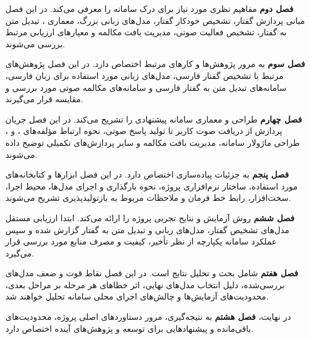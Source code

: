\textbf{فصل دوم} مفاهیم نظری مورد نیاز برای درک سامانه
را معرفی می‌کند.
در این فصل مبانی پردازش گفتار، تشخیص خودکار گفتار،
مدل‌های زبانی بزرگ، معماری ،
تبدیل متن به گفتار، تشخیص فعالیت صوتی، مدیریت بافت مکالمه
و معیارهای ارزیابی مرتبط بررسی می‌شوند.

\textbf{فصل سوم} به مرور پژوهش‌ها و کارهای مرتبط اختصاص دارد.
در این فصل پژوهش‌های مرتبط با تشخیص گفتار فارسی،
مدل‌های زبانی مورد استفاده برای زبان فارسی،
سامانه‌های تبدیل متن به گفتار فارسی و سامانه‌های مکالمه صوتی
مورد بررسی و مقایسه قرار می‌گیرند.

\textbf{فصل چهارم} طراحی و معماری سامانه پیشنهادی را تشریح
می‌کند.
در این فصل جریان پردازش از دریافت صوت کاربر تا تولید پاسخ صوتی،
نحوه ارتباط مؤلفه‌های
،  و ،
طراحی ماژولار سامانه، مدیریت بافت مکالمه و سایر پردازش‌های
تکمیلی توضیح داده می‌شوند.

\textbf{فصل پنجم} به جزئیات پیاده‌سازی اختصاص دارد.
در این فصل ابزارها و کتابخانه‌های مورد استفاده،
ساختار نرم‌افزاری پروژه، نحوه بارگذاری و اجرای مدل‌ها،
محیط اجرا، سخت‌افزار، رابط خط فرمان و ملاحظات مربوط به
بازتولیدپذیری تشریح می‌شوند.

\textbf{فصل ششم} روش آزمایش و نتایج تجربی پروژه را ارائه
می‌کند.
ابتدا ارزیابی مستقل مدل‌های تشخیص گفتار، مدل‌های زبانی و
تبدیل متن به گفتار گزارش شده و سپس عملکرد سامانه یکپارچه
از نظر تأخیر، کیفیت و مصرف منابع مورد بررسی قرار می‌گیرد.

\textbf{فصل هفتم} شامل بحث و تحلیل نتایج است.
در این فصل نقاط قوت و ضعف مدل‌های بررسی‌شده،
دلیل انتخاب مدل‌های نهایی، اثر خطاهای هر مرحله بر مراحل بعدی،
محدودیت‌های آزمایش‌ها و چالش‌های اجرای محلی سامانه تحلیل
خواهند شد.

در نهایت،
\textbf{فصل هشتم}
به نتیجه‌گیری، مرور دستاوردهای اصلی پروژه، محدودیت‌های باقی‌مانده
و پیشنهادهایی برای توسعه و پژوهش‌های آینده اختصاص دارد.
